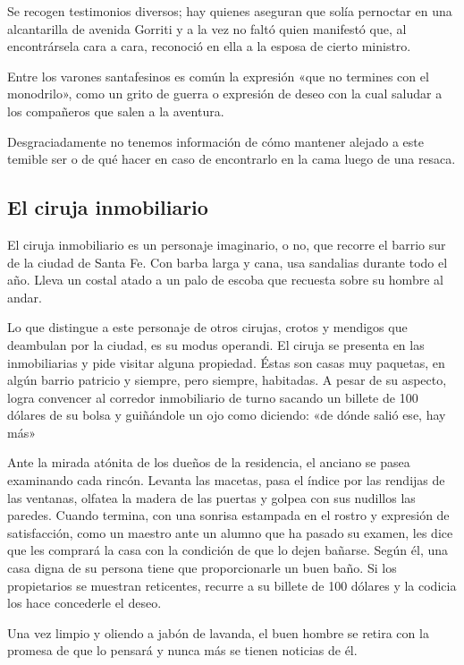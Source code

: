 \documentclass[11pt,twoside,openright,a5paper]{book}
\begin{document}
Se recogen testimonios diversos; hay quienes aseguran que solía pernoctar en una alcantarilla de avenida Gorriti y a la vez no faltó quien manifestó que, al encontrársela cara a cara, reconoció en ella a la esposa de cierto ministro.

Entre los varones santafesinos es común la expresión «que no termines con el monodrilo», como un grito de guerra o expresión de deseo con la cual saludar a los compañeros que salen a  la aventura.

Desgraciadamente no tenemos información de cómo mantener alejado a este temible ser o de qué hacer en caso de encontrarlo en la cama luego de una resaca.

\subsection*{El ciruja inmobiliario}

El ciruja inmobiliario es un personaje imaginario, o no, que recorre el barrio sur de la ciudad de Santa Fe. Con barba larga y cana, usa sandalias durante todo el año. Lleva un costal atado a un palo de escoba que recuesta sobre su hombre al andar.

Lo que distingue a este personaje de otros cirujas, crotos y mendigos que deambulan por la ciudad, es su modus operandi. El ciruja se presenta en las inmobiliarias y pide visitar alguna propiedad. Éstas son casas muy paquetas, en algún barrio patricio y siempre, pero siempre, habitadas. A pesar de su aspecto, logra convencer al corredor inmobiliario de turno sacando un billete de 100 dólares de su bolsa y guiñándole un ojo como diciendo: «de dónde salió ese, hay más»

Ante la mirada atónita de los dueños de la residencia, el anciano se pasea examinando cada rincón. Levanta las macetas, pasa el índice por las rendijas de las ventanas, olfatea la madera de las puertas y golpea con sus nudillos las paredes. Cuando termina, con una sonrisa estampada en el rostro y expresión de satisfacción, como un maestro ante un alumno que ha pasado su examen, les dice que les comprará la casa con la condición de que lo dejen bañarse. Según él, una casa digna de su persona tiene que proporcionarle un buen baño. Si los propietarios se muestran reticentes, recurre a su billete de 100 dólares y la codicia los hace concederle el deseo.

Una vez limpio y oliendo a jabón de lavanda, el buen hombre se retira con la promesa de que lo pensará y nunca más se tienen noticias de él.
\end{document}
